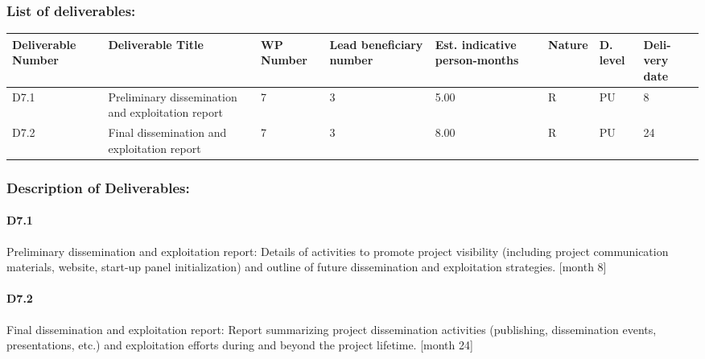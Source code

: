 \documentclass{article}
\begin{document}
\subsubsection{List of deliverables:}
\begin{center}
	\begin{tabular}{ |p{1.6cm}|p{2cm}|p{0.8cm}|p{0.8cm}|p{0.9cm}|p{1cm}|p{0.5cm}|p{0.8cm}| }
		\hline
		Deliverable Number & Deliverable Title & WP Number & Lead beneficiary number & Est. indicative person-months & Nature & D. level & Deli-very date \\ \hline
		D7.1 & Preliminary dissemination and exploitation report
 & 7 & 3 & 5.00 & R & PU & 8 \\ \hline
		D7.2 & Final dissemination and exploitation report & 7 & 3 & 8.00 & R & PU & 24 \\ \hline
	\end{tabular}
\end{center}

\subsubsection{Description of Deliverables:}
\paragraph{D7.1} Preliminary dissemination and exploitation report: Details of activities to promote project visibility (including project communication materials, website, start-up panel initialization) and outline of future dissemination and exploitation strategies. [month 8]
\paragraph{D7.2}  Final dissemination and exploitation report: Report summarizing project dissemination activities (publishing, dissemination events, presentations, etc.) and exploitation efforts during and beyond the project lifetime. [month 24]
\end{document}
